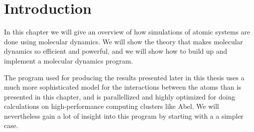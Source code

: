 \chapter*{Introduction}%
%
In this chapter we will give an overview of how simulations of atomic systems are done using molecular dynamics. We will show the theory that makes molecular dynamics so efficient and powerful, and we will show how to build up and implement a molecular dynamics program. 

The program used for producing the results presented later in this thesis uses a much more sophisticated model for the interactions between the atoms than is presented in this chapter, and is parallellized and highly optimized for doing calculations on high-performance computing clusters like Abel. We will nevertheless gain a lot of insight into this program by starting with a a simpler case.

% 
% 
% 
% 

